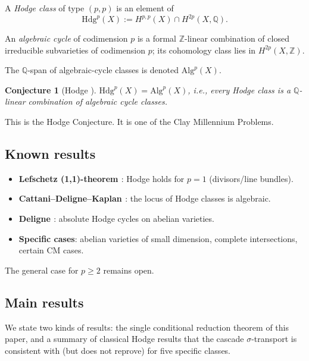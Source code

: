 \documentclass[11pt, a4paper]{amsart}
\newtheorem{conjecture}[theorem]{Conjecture}
\theoremstyle{definition}
\newcommand{\Q}{\mathbb{Q}}
\newcommand{\Z}{\mathbb{Z}}
\begin{document}
A \emph{Hodge class} of type $(p, p)$ is an element of
\[
\mathrm{Hdg}^p(X) := H^{p,p}(X) \cap H^{2p}(X, \Q).
\]

An \emph{algebraic cycle} of codimension $p$ is a formal
$\Z$-linear combination of closed irreducible subvarieties of
codimension $p$; its cohomology class lies in $H^{2p}(X, \Z)$.

The $\Q$-span of algebraic-cycle classes is denoted $\mathrm{Alg}^p(X)$.

\begin{conjecture}[Hodge \cite{Hodge1950}]
$\mathrm{Hdg}^p(X) = \mathrm{Alg}^p(X)$, i.e., every Hodge class is a
$\Q$-linear combination of algebraic cycle classes.
\end{conjecture}

This is the Hodge Conjecture. It is one of the Clay Millennium Problems.

\subsection{Known results}

\begin{itemize}
\item \textbf{Lefschetz (1,1)-theorem \cite{Lefschetz1924}}: Hodge
holds for $p = 1$ (divisors/line bundles).
\item \textbf{Cattani--Deligne--Kaplan \cite{CDK1995}}: the locus of
Hodge classes is algebraic.
\item \textbf{Deligne \cite{Deligne1982}}: absolute Hodge cycles on
abelian varieties.
\item \textbf{Specific cases}: abelian varieties of small dimension,
complete intersections, certain CM cases.
\end{itemize}

The general case for $p \geq 2$ remains open.

\subsection{Main results}

We state two kinds of results: the single conditional reduction
theorem of this paper, and a summary of classical Hodge results
that the cascade $\sigma$-transport is consistent with (but does
not reprove) for five specific classes.
\end{document}

